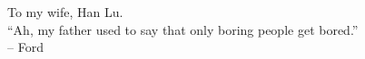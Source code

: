 

\begin{dedication}
   To my wife, Han Lu. \\[3ex]
   ``Ah, my father used to say that only boring people get bored.''\\
         -- Ford\cite{westworld2016}
\end{dedication}
